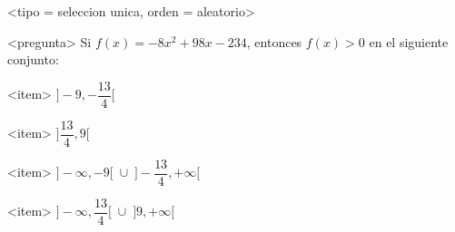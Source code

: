 <tipo = seleccion unica, orden = aleatorio>

<pregunta>
Si $f(x) = -8x^2 +98x -234$, entonces $f(x) > 0$ en el siguiente conjunto:


<item>
$\bigg]-9, -\dfrac{13}{4}\bigg[$

<item>
$\bigg]\dfrac{13}{4}, 9\bigg[$

<item>
$\bigg]{-}\infty, -9\bigg[\;\cup\; \bigg]-\dfrac{13}{4},+\infty\bigg[$

<item>
$\bigg]{-}\infty, \dfrac{13}{4}\bigg[\;\cup\; \bigg]9,+\infty\bigg[$

 

